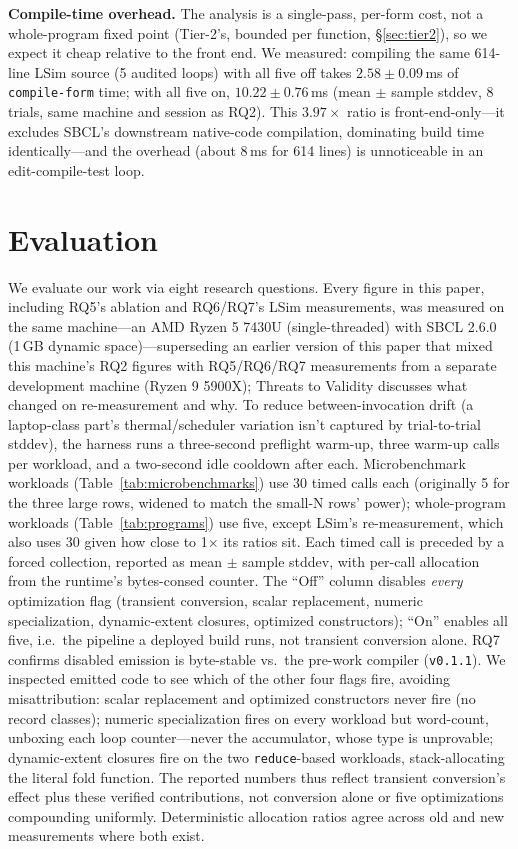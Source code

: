 \documentclass[sigplan,review,anonymous]{acmart}
\begin{document}
\textbf{Compile-time overhead.} The analysis is a single-pass, per-form cost, not a whole-program fixed point (Tier-2's, bounded per function, §\ref{sec:tier2}), so we expect it cheap relative to the front end. We measured: compiling the same 614-line LSim source (5 audited loops) with all five off takes $2.58\pm0.09$\,ms of \texttt{compile-form} time; with all five on, $10.22\pm0.76$\,ms (mean $\pm$ sample stddev, 8 trials, same machine and session as RQ2). This $3.97\times$ ratio is front-end-only---it excludes SBCL's downstream native-code compilation, dominating build time identically---and the overhead (about 8\,ms for 614 lines) is unnoticeable in an edit-compile-test loop.

\section{Evaluation}
\label{sec:eval}
We evaluate our work via eight research questions. Every figure in this paper, including RQ5's ablation and RQ6/RQ7's LSim measurements, was measured on the same machine---an AMD Ryzen 5 7430U (single-threaded) with SBCL 2.6.0 (1\,GB dynamic space)---superseding an earlier version of this paper that mixed this machine's RQ2 figures with RQ5/RQ6/RQ7 measurements from a separate development machine (Ryzen 9 5900X); Threats to Validity discusses what changed on re-measurement and why. To reduce between-invocation drift (a laptop-class part's thermal/scheduler variation isn't captured by trial-to-trial stddev), the harness runs a three-second preflight warm-up, three warm-up calls per workload, and a two-second idle cooldown after each. Microbenchmark workloads (Table~\ref{tab:microbenchmarks}) use 30 timed calls each (originally 5 for the three large rows, widened to match the small-N rows' power); whole-program workloads (Table~\ref{tab:programs}) use five, except LSim's re-measurement, which also uses 30 given how close to 1$\times$ its ratios sit. Each timed call is preceded by a forced collection, reported as mean $\pm$ sample stddev, with per-call allocation from the runtime's bytes-consed counter. The ``Off'' column disables \emph{every} optimization flag (transient conversion, scalar replacement, numeric specialization, dynamic-extent closures, optimized constructors); ``On'' enables all five, i.e.\ the pipeline a deployed build runs, not transient conversion alone. RQ7 confirms disabled emission is byte-stable vs.\ the pre-work compiler (\texttt{v0.1.1}). We inspected emitted code to see which of the other four flags fire, avoiding misattribution: scalar replacement and optimized constructors never fire (no record classes); numeric specialization fires on every workload but word-count, unboxing each loop counter---never the accumulator, whose type is unprovable; dynamic-extent closures fire on the two \texttt{reduce}-based workloads, stack-allocating the literal fold function. The reported numbers thus reflect transient conversion's effect plus these verified contributions, not conversion alone or five optimizations compounding uniformly. Deterministic allocation ratios agree across old and new measurements where both exist.
\end{document}
